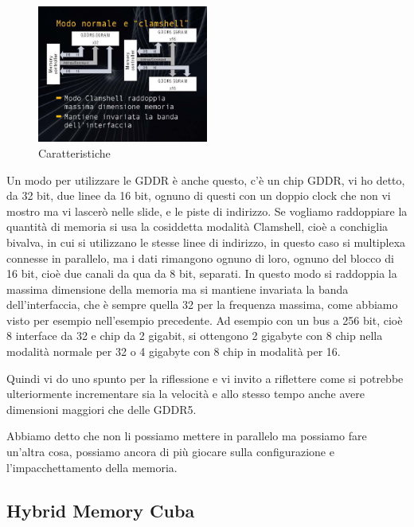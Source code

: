 \FloatBarrier
\begin{figure}[H]
  \centering
  \includegraphics[width=0.50\textwidth,
                    trim=20 20 20 20, %
                    clip]
                    {images/Lez05_p03_fig_06.png}
  \caption{Caratteristiche}
  \label{fig:Lez05_p03_fig_06}
\end{figure}
\FloatBarrier
\noindent

Un modo per utilizzare le GDDR è anche questo, c'è un chip GDDR, vi ho detto, da 32 bit, due linee da 16 bit, ognuno di questi con un doppio clock che non vi mostro ma vi lascerò nelle slide, e le piste di indirizzo.
Se vogliamo raddoppiare la quantità di memoria si usa la cosiddetta modalità Clamshell, cioè a conchiglia bivalva, in cui si utilizzano le stesse linee di indirizzo, in questo caso si multiplexa connesse in parallelo, ma i dati rimangono ognuno di loro, ognuno del blocco di 16 bit, cioè due canali da qua da 8 bit, separati.
In questo modo si raddoppia la massima dimensione della memoria ma si mantiene invariata la banda dell'interfaccia, che è sempre quella 32 per la frequenza massima, come abbiamo visto per esempio nell'esempio precedente.
Ad esempio con un bus a 256 bit, cioè 8 interface da 32 e chip da 2 gigabit, si ottengono 2 gigabyte con 8 chip nella modalità normale per 32 o 4 gigabyte con 8 chip in modalità per 16.

Quindi vi do uno spunto per la riflessione e vi invito a riflettere come si potrebbe ulteriormente incrementare sia la velocità e allo stesso tempo anche avere dimensioni maggiori che delle GDDR5.

Abbiamo detto che non li possiamo mettere in parallelo ma possiamo fare un'altra cosa, possiamo ancora di più giocare sulla configurazione e l'impacchettamento della memoria.

\subsection{Hybrid Memory Cuba}

